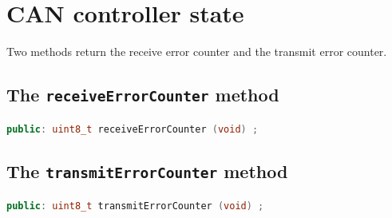 \documentclass[10pt, a4paper, obeyspaces]{extarticle}
\newcommand \sectionLabel[2]{\section{#1}\label{sec:#2}}
\begin{document}
\sectionLabel{CAN controller state}{canControllerState}

Two methods return the receive error counter and the transmit error counter.



\subsection{The \texttt{receiveErrorCounter} method}

{ \small\begin{lstlisting}[language=c++]
public: uint8_t receiveErrorCounter (void) ;
\end{lstlisting}}



\subsection{The \texttt{transmitErrorCounter} method}

{ \small\begin{lstlisting}[language=c++]
public: uint8_t transmitErrorCounter (void) ;
\end{lstlisting}}


\end{document}
